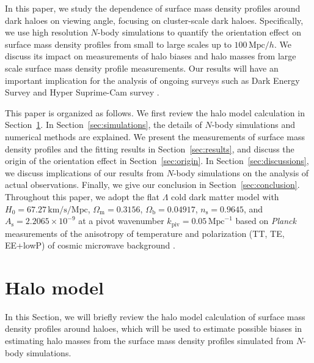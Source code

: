 \documentclass[a4paper,fleqn,usenatbib]{mnras}
\newcommand{\Mpc}{\mathrm{Mpc}}
\begin{document}
In this paper, we study the dependence of surface mass density
profiles around dark haloes on viewing angle, focusing on
cluster-scale dark haloes. Specifically, we use high resolution
$N$-body simulations to quantify the orientation effect on surface
mass density profiles from small to large scales up to
$100\,\Mpc/h$. We discuss its impact on measurements of halo biases
and halo masses from large scale surface mass density profile
measurements. Our results will have an important implication for the
analysis of ongoing surveys such as Dark Energy Survey \citep{DES2016}
and Hyper Suprime-Cam survey \citep{Aihara2018}.

This paper is organized as follows.
We first review the halo model calculation in Section~\ref{sec:formalism}.
In Section~\ref{sec:simulations}, the details of
$N$-body simulations and numerical methods are explained.
We present the measurements of surface mass density profiles
and the fitting results in Section~\ref{sec:results}, and
discuss the origin of the orientation effect in Section~\ref{sec:origin}.
In Section~\ref{sec:discussions}, we discuss implications of our
results from $N$-body simulations on the analysis of actual
observations. Finally, we give our conclusion in Section~\ref{sec:conclusion}.
Throughout this paper, we adopt the flat $\Lambda$ cold dark matter
model with $H_0 = 67.27\,\mathrm{km}/\mathrm{s}/\Mpc$,
$\Omega_\mathrm{m} = 0.3156$, $\Omega_\mathrm{b} = 0.04917$,
$n_\mathrm{s} = 0.9645$, and $A_\mathrm{s} = 2.2065 \times 10^{-9}$
at a pivot wavenumber $k_\mathrm{piv} = 0.05 \, \Mpc^{-1}$
based on {\it Planck} measurements of the anisotropy of
temperature and polarization (TT, TE, EE+lowP) of cosmic microwave
background \citep{Planck2016}.

\section{Halo model}
\label{sec:formalism}
In this Section, we will briefly review the halo model calculation of
surface mass density profiles around haloes, which will be used to
estimate possible biases in estimating halo masses from
the surface mass density profiles simulated from $N$-body simulations.
\end{document}
